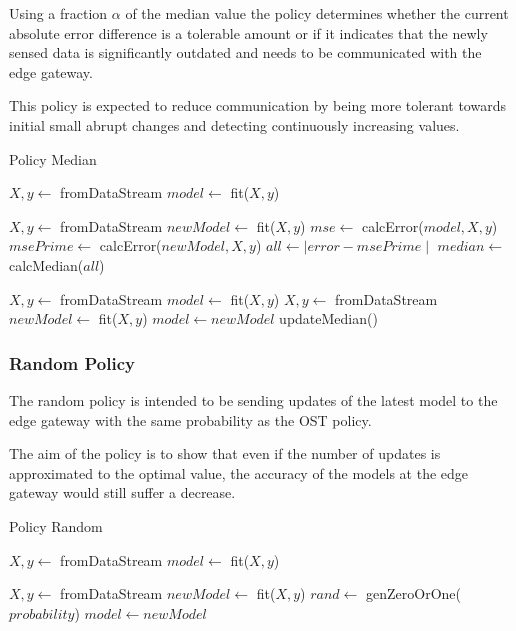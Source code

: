 \documentclass{mpaper}
\begin{document}
Using a fraction $\alpha$ of the median value the policy determines whether the current absolute error difference is a tolerable amount or if it indicates that the newly sensed data is significantly outdated and needs to be communicated with the edge gateway.

This policy is expected to reduce communication by being more tolerant towards initial small abrupt changes and detecting continuously increasing values.

\begin{algorithm}[h]
\caption{Policy Median}\label{polM}
\begin{algorithmic}
    \State $X, y \gets$ fromDataStream
    \State $model \gets$ fit($X,y$)
    
        \State $X, y \gets$ fromDataStream
        \State $newModel \gets$ fit($X,y$)
        \State $mse \gets$ calcError($model,X,y$)
        \State $msePrime \gets$ calcError($newModel,X,y$)
        \State $all \gets \mid error - msePrime \mid$
    \EndFor
    \State $median \gets$ calcMedian($all$)
\EndProcedure

\State $X, y \gets$ fromDataStream
\State $model \gets$ fit($X,y$)
    \State $X, y \gets$ fromDataStream
    \State $newModel \gets$ fit($X,y$)
        \State $model \gets newModel$ 
    \EndIf
        \State updateMedian()
    \EndIf
\EndWhile
\end{algorithmic}
\end{algorithm}

\subsubsection{Random Policy}
The random policy is intended to be sending updates of the latest model to the edge gateway with the same probability as the OST policy.

The aim of the policy is to show that even if the number of updates is approximated to the optimal value, the accuracy of the models at the edge gateway would still suffer a decrease.

\begin{algorithm}[h]
\caption{Policy Random}\label{polR}
\begin{algorithmic}
\State $X,y \gets$ fromDataStream
\State $model \gets$ fit($X,y$)

    \State $X, y \gets$ fromDataStream
    \State $newModel \gets$ fit($X,y$)
    \State $rand \gets$ genZeroOrOne($probability$)
        \State $model \gets newModel$ 
    \EndIf
\EndWhile
\end{algorithmic}
\end{algorithm}
\end{document}
